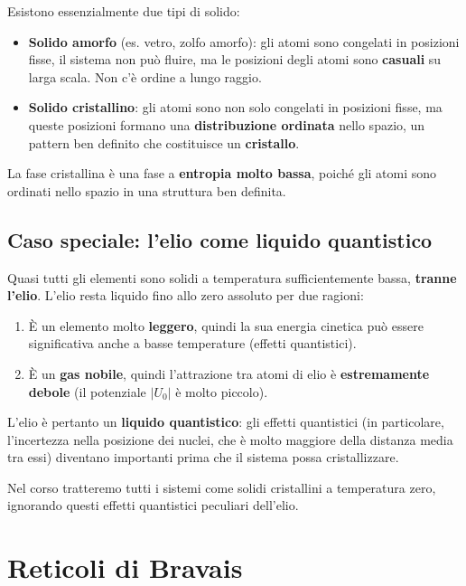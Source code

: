 Esistono essenzialmente due tipi di solido:
\begin{itemize}
    \item \textbf{Solido amorfo} (es. vetro, zolfo amorfo): gli atomi sono congelati in posizioni fisse, il sistema non può fluire, ma le posizioni degli atomi sono \textbf{casuali} su larga scala. Non c'è ordine a lungo raggio.
    \item \textbf{Solido cristallino}: gli atomi sono non solo congelati in posizioni fisse, ma queste posizioni formano una \textbf{distribuzione ordinata} nello spazio, un pattern ben definito che costituisce un \textbf{cristallo}.
\end{itemize}

La fase cristallina è una fase a \textbf{entropia molto bassa}, poiché gli atomi sono ordinati nello spazio in una struttura ben definita.

\subsection*{Caso speciale: l'elio come liquido quantistico}

Quasi tutti gli elementi sono solidi a temperatura sufficientemente bassa, \textbf{tranne l'elio}. L'elio resta liquido fino allo zero assoluto per due ragioni:
\begin{enumerate}
    \item È un elemento molto \textbf{leggero}, quindi la sua energia cinetica può essere significativa anche a basse temperature (effetti quantistici).
    \item È un \textbf{gas nobile}, quindi l'attrazione tra atomi di elio è \textbf{estremamente debole} (il potenziale $|U_0|$ è molto piccolo).
\end{enumerate}

L'elio è pertanto un \textbf{liquido quantistico}: gli effetti quantistici (in particolare, l'incertezza nella posizione dei nuclei, che è molto maggiore della distanza media tra essi) diventano importanti prima che il sistema possa cristallizzare.

\begin{nota}
Nel corso tratteremo tutti i sistemi come solidi cristallini a temperatura zero, ignorando questi effetti quantistici peculiari dell'elio.
\end{nota}

\section{Reticoli di Bravais}

